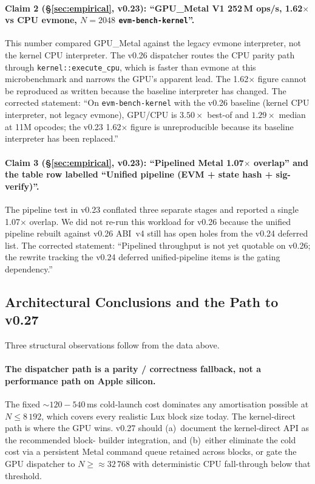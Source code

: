 \paragraph{Claim 2 (\S\ref{sec:empirical}, v0.23):
``GPU\_Metal V1 252\,M ops/s, 1.62$\times$ vs CPU evmone, $N=2048$
\texttt{evm-bench-kernel}''.}

This number compared GPU\_Metal against the legacy evmone interpreter,
not the kernel CPU interpreter. The v0.26 dispatcher routes the CPU
parity path through \texttt{kernel::execute\_cpu}, which is faster
than evmone at this microbenchmark and narrows the GPU's apparent
lead. The 1.62$\times$ figure cannot be reproduced as written because
the baseline interpreter has changed. The corrected statement: ``On
\texttt{evm-bench-kernel} with the v0.26 baseline (kernel CPU
interpreter, not legacy evmone), GPU/CPU is $3.50\times$ best-of and
$1.29\times$ median at 11M opcodes; the v0.23 1.62$\times$ figure is
unreproducible because its baseline interpreter has been replaced.''

\paragraph{Claim 3 (\S\ref{sec:empirical}, v0.23):
``Pipelined Metal 1.07$\times$ overlap'' and the table row labelled
``Unified pipeline (EVM + state hash + sig-verify)''.}

The pipeline test in v0.23 conflated three separate stages and
reported a single 1.07$\times$ overlap. We did not re-run this
workload for v0.26 because the unified pipeline rebuilt against
v0.26 ABI~v4 still has open holes from the v0.24 deferred list. The
corrected statement: ``Pipelined throughput is not yet quotable on
v0.26; the rewrite tracking the v0.24 deferred unified-pipeline items
is the gating dependency.''

\subsection{Architectural Conclusions and the Path to v0.27}
\label{sec:v026:v027}

Three structural observations follow from the data above.

\paragraph{The dispatcher path is a parity / correctness fallback,
not a performance path on Apple silicon.} The fixed
$\sim 120{-}540$\,ms cold-launch cost dominates any amortisation
possible at $N \le 8\,192$, which covers every realistic Lux block
size today. The kernel-direct path is where the GPU wins. v0.27
should (a)~document the kernel-direct API as the recommended block-
builder integration, and (b)~either eliminate the cold cost via a
persistent Metal command queue retained across blocks, or gate the
GPU dispatcher to $N \ge \approx 32\,768$ with deterministic CPU
fall-through below that threshold.

